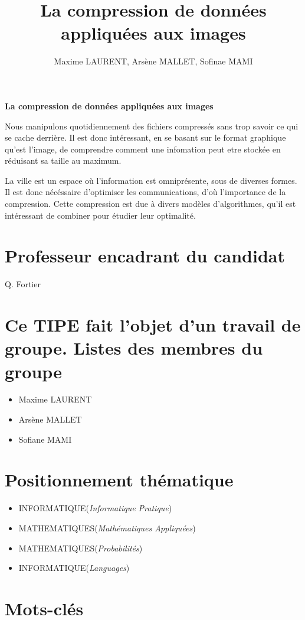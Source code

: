 \documentclass{article}
\author{Maxime LAURENT, Arsène MALLET, Sofinae MAMI}
\title{La compression de donn\'ees appliqu\'ees aux images}
\begin{document}
    
\begin{center}
    {\textbf {\LARGE La compression de donn\'ees appliqu\'ees aux images}}
\end{center}

\vspace{5mm}

Nous manipulons quotidiennement des fichiers compressés sans trop savoir ce qui se cache derrière. Il est donc intéressant, en se basant sur le format graphique qu'est l'image, de comprendre comment une infomation peut etre stockée en réduisant sa taille au maximum.

La ville est un espace où l'information est omniprésente, sous de diverses formes. Il est donc nécéssaire d'optimiser les communications, d'où l'importance de la compression. Cette compression est due à divers modèles d'algorithmes, qu'il est intéressant de combiner pour étudier leur optimalité. 

\section*{Professeur encadrant du candidat}
Q. Fortier

\section*{Ce TIPE fait l'objet d'un travail de groupe. \newline Listes des membres du groupe}
\begin{itemize}
    \item Maxime LAURENT
    \item Arsène MALLET
    \item Sofiane MAMI
\end{itemize}

\section*{Positionnement th\'ematique}
\begin{itemize}
    \item INFORMATIQUE(\textit{Informatique Pratique})
    \item MATHEMATIQUES(\textit{Math\'ematiques Appliqu\'ees})
    \item MATHEMATIQUES(\textit{Probabilit\'es})
    \item INFORMATIQUE(\textit{Languages})
\end{itemize}

\section*{Mots-cl\'es}
\end{document}
